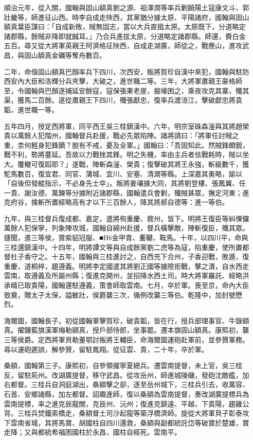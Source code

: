 \begin{pinyinscope}
順治元年，從入關，國翰與固山額真劉之源、祖澤潤等率兵剿饒陽土寇康文斗、郭壯畿等，師進征山西。時李自成走陜西，其黨猶分據太原、平陽諸府，國翰與固山額真葉臣謀曰：「自成新敗，賊無固志，當以大兵直搗太原。太原既下，分道略定諸郡縣，餘賊非降即就馘耳。」乃合兵進拔太原，分道略定諸郡縣。師還，賚白金五百。尋又從大將軍英親王阿濟格征陜西，自成走湖廣，師從之，戰應山，進攻武昌，與固山額真金礪等奪舟數百。

二年，命偕固山額真巴顏率兵下四川，次西安，叛將賀珍自漢中來犯，國翰與駐防西安內大臣和洛輝分兵夾擊，大破之，進世職二等。三年，大將軍肅親王豪格師至，令國翰與巴顏逐捕延安餘寇，寇保張果老崖，掘壕困之，乘夜攻克其寨，殲其渠，獲馬二百餘。遂從肅親王下四川，殲張獻忠，復率兵渡涪江，擊破獻忠將袁韜，進世職一等。

五年四月，授定西將軍，同平西王吳三桂鎮漢中。六年，明宗室硃森滏與其將趙榮貴以萬餘人犯階州，國翰督兵赴援，戰必先眾陷陣。諸將請曰：「將軍任討賊之重，柰何輕身犯鋒鏑？脫有不戒，憂及全軍。」國翰曰：「吾固知此。然賊鋒頗銳，戰不利，勢將蔓延。吾故以力戰挫其鋒。明之失機，率由主兵者怯戰耗時，賊以坐大。覆轍可復蹈耶？」遂戰，陣斬森滏、榮貴；復擊破其將王永強，斬級數千，獲駝馬數百，復宜君、同官、蒲城、宜川、安塞、清澗等縣。上深嘉其勇略，諭以「自後但發縱指示，不必身先士卒」。叛將姜瓖據大同，其將劉登樓、張鳳翼、任一貴、謝汝德、萬鍊等分據附近諸郡縣，國翰遣兵會剿，殲賊甚眾，撫定河東；進克府谷，擒斬所置經略高有才以下三百餘人，降其將郝自德等：進一等伯。

九年，與三桂督兵復成都、嘉定，遣將徇重慶、敘州，皆下。明將王復臣等糾惈儸萬餘人犯保寧，列象陣攻城，國翰自綿州赴援，督兵橫擊敵，陣斬復臣，殲其眾。捷聞，進三等侯，賞紫貂冠服、■H6金甲胄、櫜鞬、鞍馬。十年，以四川平，命與三桂還鎮漢中。十四年，明將譚文等與自成餘黨劉二虎等為寇，陷重慶，使所置都督杜子香守之。十五年，國翰與三桂進討之，自西充下合州，子香迎戰，敗遁，復重慶，道桐梓，趨遵義。明將李定國遣其將劉正國等據險拒戰，擊之潰，自水西走雲南，取遵義及所屬州縣；復進克開州，並招降水西土司。時大將軍羅託、經略洪承疇已取貴陽，國翰還駐遵義，策會師取雲南。七月，卒於軍。喪至京，命內大臣致奠，贈太子太保，謚敏壯，侯爵襲三次，循例改襲三等伯。乾隆中，加封號懋烈。

海爾圖，國翰長子。初從國翰軍擊賀珍，破袁韜，皆在行，授兵部理事官、牛錄額真。擢鑲藍旗漢軍梅勒額真，授戶部侍郎，坐事罷。遷本旗固山額真。康熙初，襲三等侯爵。定西將軍貝勒董鄂討叛將王輔臣，命海爾圖運砲赴軍前，並參贊軍務。尋以運砲遲誤，解參贊，留駐鳳翔。從征雲、貴，二十年，卒於軍。

桑額，國翰第三子。康熙初，自參領擢寧夏總兵。遷雲南提督，未上官，吳三桂反，留駐荊州。改湖廣提督，移守武昌。從攻岳州，師進城陵磯，發砲沈敵艦，加右都督。三桂兵自洞庭湖出，桑額擊之卻，逐至岳州城下，三桂兵引去，收萬容、石首、安鄉諸縣，加左都督。詔趣進師，復以桑額為雲南提督，奏改湖廣提標兵為雲南提標，率之進克辰龍關，克辰州、沅州；復進克鎮遠、平越，下貴陽，趨雞公背。三桂兵焚鐵索橋走，桑額督土司沙起龍等築浮橋濟師。旋從大將軍貝子彰泰攻下雲南省城，其將馬寶、胡國柱自四川還救，桑額與副都統託岱等破寶於楚雄，寶走降；又與都統希福困國柱於永昌，國柱自經死。雲南平。


\end{pinyinscope}
